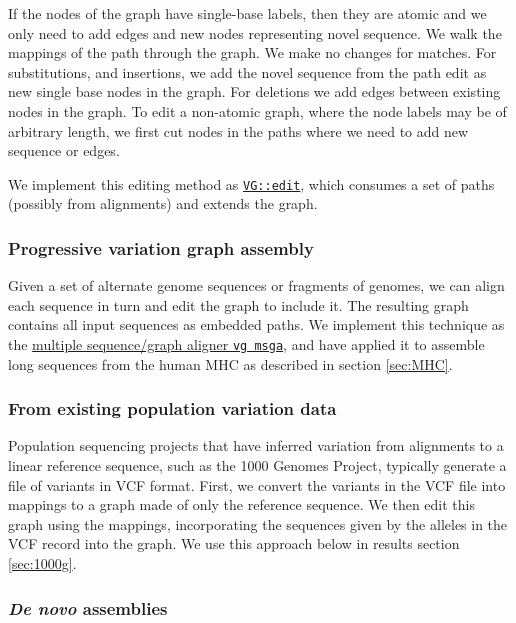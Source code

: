 \documentclass[12pt]{article}
\begin{document}
If the nodes of the graph have single-base labels, then they are atomic and we only need to add edges and new nodes representing novel sequence.
We walk the mappings of the path through the graph.
We make no changes for matches.
For substitutions, and insertions, we add the novel sequence from the path edit as new single base nodes in the graph.
For deletions we add edges between existing nodes in the graph.
To edit a non-atomic graph, where the node labels may be of arbitrary length, we first cut nodes in the paths where we need to add new sequence or edges. 

We implement this editing method as \href{https://github.com/vgteam/vg/blob/fbcb6e62/src/vg.cpp#L4846-L4912}{{\tt VG::edit}}, which consumes a set of paths (possibly from alignments) and extends the graph.

\subsubsection{Progressive variation graph assembly}

Given a set of alternate genome sequences or fragments of genomes, we can align each sequence in turn and edit the graph to include it.
The resulting graph contains all input sequences as embedded paths.
We implement this technique as the \href{https://github.com/vgteam/vg/blob/fbcb6e62/src/main.cpp#L674-L1248}{multiple sequence/graph aligner {\tt vg msga}}, and have applied it to assemble long sequences from the human MHC as described in section \ref{sec:MHC}.

\subsubsection{From existing population variation data}

Population sequencing projects that have inferred variation from alignments to a linear reference sequence, such as the 1000 Genomes Project, typically generate a file of variants in VCF format.
First, we convert the variants in the VCF file into mappings to a graph made of only the reference sequence. 
We then edit this graph using the mappings, incorporating the sequences given by the alleles in the VCF record into the graph. 
We use this approach below in results section \ref{sec:1000g}.

\subsubsection{\emph{De novo} assemblies}
\end{document}

